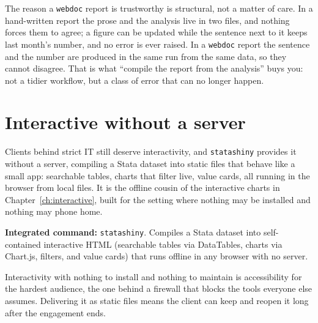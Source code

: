\documentclass[
    a4paper,
    fontsize=10pt,
    twoside=true,
    numbers=noenddot,
]{kaobook}
\newenvironment{vizcallout}[1][Visualization to build]{%
    \begin{vizbox}[frametitle={#1}]%
}{%
    \end{vizbox}%
}
\begin{document}
\begin{vizcallout}[Why the numbers cannot lie]
The reason a \texttt{webdoc} report is trustworthy is structural, not a matter of care. In a hand-written report the prose and the analysis live in two files, and nothing forces them to agree; a figure can be updated while the sentence next to it keeps last month's number, and no error is ever raised. In a \texttt{webdoc} report the sentence and the number are produced in the same run from the same data, so they cannot disagree. That is what \enquote{compile the report from the analysis} buys you: not a tidier workflow, but a class of error that can no longer happen.
\end{vizcallout}

\section{Interactive without a server}
Clients behind strict IT still deserve interactivity, and \texttt{statashiny} provides it without a server, compiling a Stata dataset into static files that behave like a small app: searchable tables, charts that filter live, value cards, all running in the browser from local files. It is the offline cousin of the interactive charts in Chapter~\ref{ch:interactive}, built for the setting where nothing may be installed and nothing may phone home.

\begin{kaobox}[frametitle=Package Integration: \texttt{statashiny}]
\textbf{Integrated command:} \texttt{statashiny}. Compiles a Stata dataset into self-contained interactive HTML (searchable tables via DataTables, charts via Chart.js, filters, and value cards) that runs offline in any browser with no server.
\end{kaobox}

Interactivity with nothing to install and nothing to maintain is accessibility for the hardest audience, the one behind a firewall that blocks the tools everyone else assumes. Delivering it as static files means the client can keep and reopen it long after the engagement ends.
\end{document}

